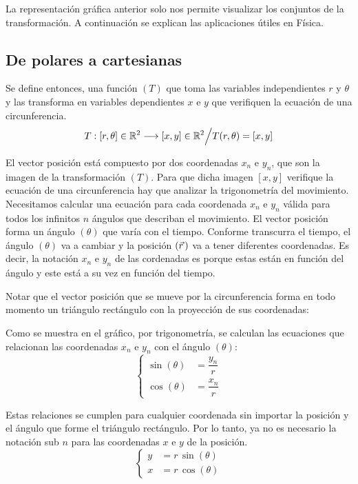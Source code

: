 La representación gráfica anterior solo nos permite visualizar los conjuntos de la transformación.
A continuación se explican las aplicaciones útiles en Física.

\subsection{De polares a cartesianas}

Se define entonces, una función $(T)$ que toma las variables independientes $r$ y $\theta$ y las transforma en variables dependientes $x$ e $y$ que verifiquen la ecuación de una circunferencia.
\[
    T:[r,\theta] \in \mathbb{R}^2 \longrightarrow [x,y] \in \mathbb{R}^2 \Big/
    T(r,\theta) = [x,y]
\]

El vector posición está compuesto por dos coordenadas $x_n$ e $y_n$, que son la imagen de la transformación $(T)$.
Para que dicha imagen $[x,y]$ verifique la ecuación de una circunferencia hay que analizar la trigonometría del movimiento.
Necesitamos calcular una ecuación para cada coordenada $x_n$ e $y_n$ válida para todos los infinitos $n$ ángulos que describan el movimiento.
El vector posición forma un ángulo $(\theta)$ que varía con el tiempo.
Conforme transcurra el tiempo, el ángulo $(\theta)$ va a cambiar y la posición $(\vec{r}\hspace{0.05cm})$ va a tener diferentes coordenadas.
Es decir, la notación $x_n$ e $y_n$ de las cordenadas es porque estas están en función del ángulo y este está a su vez en función del tiempo.

Notar que el vector posición que se mueve por la circunferencia forma en todo momento un triángulo rectángulo con la proyección de sus coordenadas:

\begin{center}
    \def\svgwidth{0.4\linewidth}
    
\end{center}

Como se muestra en el gráfico, por trigonometría, se calculan las ecuaciones que relacionan las coordenadas $x_n$ e $y_n$ con el ángulo $(\theta)$:
\[
  \left\{
    \begin{aligned}
      \sin{(\theta)} &= \dfrac{y_n}{r}
      \\[1ex]
      \cos{(\theta)} &= \dfrac{x_n}{r}
    \end{aligned}
  \right.
\]

Estas relaciones se cumplen para cualquier coordenada sin importar la posición y el ángulo que forme el triángulo rectángulo.
Por lo tanto, ya no es necesario la notación sub $n$ para las coordenadas $x$ e $y$ de la posición.
\[
  \left\{
    \begin{aligned}
      y &= r \, \sin{(\theta)}
      \\
      x &= r \, \cos{(\theta)}
    \end{aligned}
  \right.
\]

